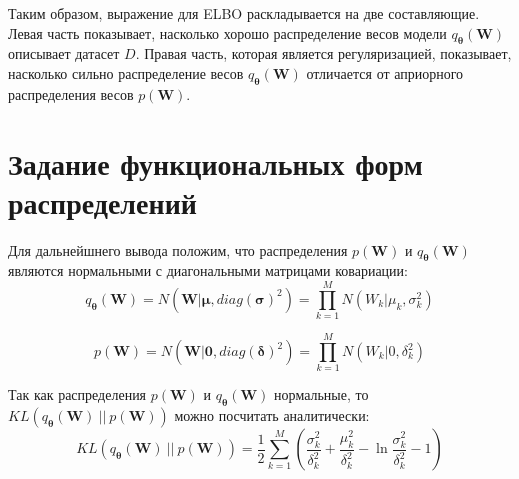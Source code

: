 \documentclass{article}
\numberwithin{equation}{section}
\begin{document}
    Таким образом, выражение для ELBO раскладывается на две составляющие.
    Левая часть показывает, насколько хорошо распределение весов модели
    $q_{\pmb{\theta}}(\pmb{W})$ описывает датасет $D$.
    Правая часть, которая является регуляризацией, показывает, насколько сильно распределение весов
    $q_{\pmb{\theta}}(\pmb{W})$ отличается от априорного распределения
    весов $p(\pmb{W})$.

    \section{Задание функциональных форм распределений}

    Для дальнейшнего вывода положим,
    что распределения $p(\pmb{W})$ и $q_{\pmb{\theta}}(\pmb{W})$
    являются нормальными с диагональными матрицами ковариации:
    \begin{equation}
        q_{\pmb{\theta}}(\pmb{W})
        =
            N(
                \pmb{W} | \pmb{\mu}, diag(\pmb{\sigma})^{2}
            )
        =
            \prod_{k=1}^M
            N(
                W_k | \mu_k, \sigma_k^2
            )
    \end{equation}

    \begin{equation}
        p(\pmb{W})
        =
            N(
                \pmb{W} | \pmb{0}, diag(\pmb{\delta})^{2}
            )
        =
            \prod_{k=1}^M
            N(
                W_k | 0, \delta_k^2
            )
    \end{equation}

    Так как распределения $p(\pmb{W})$ и $q_{\pmb{\theta}}(\pmb{W})$ нормальные, то
    $KL(q_{\pmb{\theta}}(\pmb{W})~||~p(\pmb{W}))$
    можно посчитать аналитически:
    \begin{equation}\label{kl_init}
        KL(
            q_{\pmb{\theta}}(\pmb{W})~||~p(\pmb{W})
        )
        =
            \frac{1}{2}\sum_{k=1}^{M}(
                \frac
                    {\sigma_{k}^2}
                    {\delta_{k}^2}
                +
                \frac
                    {\mu_{k}^2}
                    {\delta_{k}^2}
                -
                \ln{
                    \frac
                        {\sigma_{k}^2}
                        {\delta_{k}^2}
                }
                - 1
            )
    \end{equation}
\end{document}
